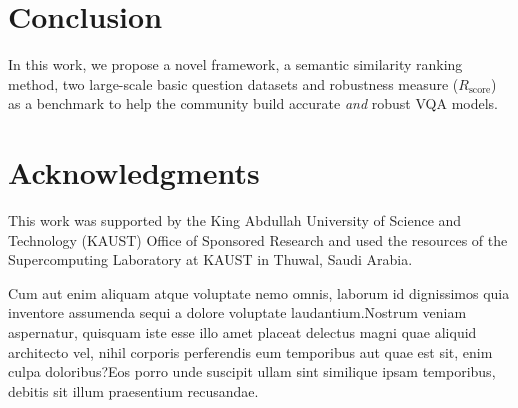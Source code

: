 \documentclass[letterpaper]{article}
\newcommand{\rscore}{}\def\rscore/{$R_{\text{score}}$}
\begin{document}
\section{Conclusion}
In this work, we propose a novel framework, a semantic similarity ranking method, two large-scale basic question datasets and robustness measure (\rscore/) as a benchmark to help the community build accurate \emph{and} robust VQA models.

\section{Acknowledgments}
This work was supported by the King Abdullah University of Science and Technology (KAUST) Office of Sponsored Research and used the resources of the Supercomputing Laboratory at KAUST in Thuwal, Saudi Arabia.

{\small
Cum aut enim aliquam atque voluptate nemo omnis, laborum id dignissimos quia inventore assumenda sequi a dolore voluptate laudantium.Nostrum veniam aspernatur, quisquam iste esse illo amet placeat delectus magni quae aliquid architecto vel, nihil corporis perferendis eum temporibus aut quae est sit, enim culpa doloribus?Eos porro unde suscipit ullam sint similique ipsam temporibus, debitis sit illum praesentium recusandae.\clearpage


}
\end{document}
